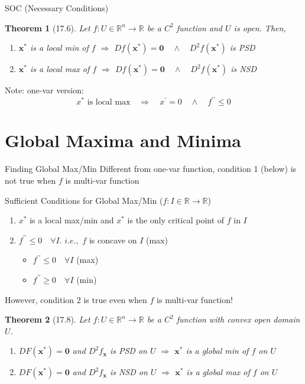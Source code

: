 \documentclass[a4paper,11pt]{article}
\newtheorem{thm}{Theorem}
\newcommand{\bb}{\mathbb}
\newcommand{\bd}{\mathbf}
\begin{document}
\begin{frame}[t]{SOC (Necessary Conditions)}
	\begin{thm}
		[17.6] Let $f:U\in\bb{R}^n\rightarrow\bb{R}$ be a $C^2$ function and $U$ is open. Then,
		\begin{enumerate}
			\item $\bd{x^\ast}$ is a local min of $f$ $\Rightarrow$ $Df(\bd{x^\ast})=\bd{0}\quad\land\quad D^2f(\bd{x^\ast})$ is PSD
			\item $\bd{x^\ast}$ is a local max of $f$ $\Rightarrow$ $Df(\bd{x^\ast})=\bd{0}\quad\land\quad D^2f(\bd{x^\ast})$ is NSD
		\end{enumerate}
	\end{thm}
	Note: one-var version: \[
		x^\ast\text{ is local max} \quad\Rightarrow\quad x^\prime=0\quad\land\quad f^{\prime\prime}\le 0
	\]
\end{frame}

\section{Global Maxima and Minima} %
\label{sec:global_maxima_and_minima}
\begin{frame}[t]{Finding Global Max/Min}
	Different from one-var function, condition 1 (below) is not true when $f$ is multi-var function
	\begin{block}
		{Sufficient Conditions for Global Max/Min ($f:I\in\bb{R}\rightarrow\bb{R}$)}
		\begin{enumerate}
			\item $x^\ast$ is a local max/min and $x^\ast$ is the only critical point of $f$ in $I$
			\item $f^{\prime\prime}\le 0\quad\forall I$. $i.e.,$ $f$ is concave on $I$ (max)
			\begin{itemize}
				\item $f^{\prime\prime}\le 0 \quad \forall I$ (max)
				\item $f^{\prime\prime}\ge 0 \quad \forall I$ (min)
			\end{itemize}
		\end{enumerate}
	\end{block}
	However, condition 2 is true even when $f$ is multi-var function!
	\begin{thm}
		[17.8]
		Let $f:U\in \bb{R}^n\rightarrow \bb{R}$ be a $C^2$ function with convex open domain $U$.
		\begin{enumerate}
			\item $DF(\bd{x^\ast})=\bd{0}$ and $D^2f_{\bd{x}}$ is PSD on $U$ $\Rightarrow $ $\bd{x^\ast}$ is a global min of $f$ on $U$
			\item $DF(\bd{x^\ast})=\bd{0}$ and $D^2f_{\bd{x}}$ is NSD on $U$ $\Rightarrow $ $\bd{x^\ast}$ is a global max of $f$ on $U$
		\end{enumerate}
	\end{thm}
\end{frame}
\end{document}
